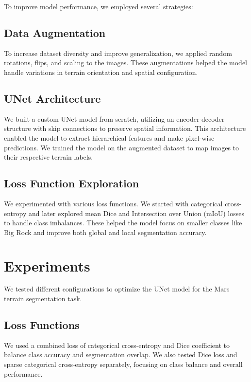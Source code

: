 \documentclass[11pt]{article}
\begin{document}
\begin{multicols}{2}
        To improve model performance, we employed several strategies:
        
        \subsection{Data Augmentation}
        To increase dataset diversity and improve generalization, we applied random rotations, flips, and scaling to the images. These augmentations helped the model handle variations in terrain orientation and spatial configuration.
        
        \subsection{UNet Architecture}
        We built a custom UNet model from scratch, utilizing an encoder-decoder structure with skip connections to preserve spatial information. This architecture enabled the model to extract hierarchical features and make pixel-wise predictions. We trained the model on the augmented dataset to map images to their respective terrain labels.
        
        \subsection{Loss Function Exploration}
        We experimented with various loss functions. We started with categorical cross-entropy and later explored mean Dice and Intersection over Union (mIoU) losses to handle class imbalances. These helped the model focus on smaller classes like Big Rock and improve both global and local segmentation accuracy.
        
        \section{Experiments}
        
        We tested different configurations to optimize the UNet model for the Mars terrain segmentation task.
        
        \subsection{Loss Functions}
        We used a combined loss of categorical cross-entropy and Dice coefficient to balance class accuracy and segmentation overlap. We also tested Dice loss and sparse categorical cross-entropy separately, focusing on class balance and overall performance.
        

\end{multicols}
\end{document}
